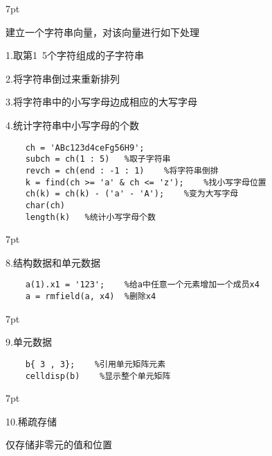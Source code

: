 \documentclass{article} %
\newenvironment{eg}{%
\def\FrameCommand{%
\hspace{1pt}%
{\color{Gray}\vrule width 2pt}%
{\color{egshade}\vrule width 4pt}%
\colorbox{egshade}%
}%
\MakeFramed{\advance\hsize-\width\FrameRestore}%
\noindent\hspace{-4.55pt}%
\begin{adjustwidth}{}{7pt}%
\vspace{2pt}\vspace{2pt}%
\normalfont %
}
{%
\vspace{2pt}\end{adjustwidth}\endMakeFramed%
}
\newenvironment{wa}{%
\def\FrameCommand{%
\hspace{1pt}%
{\color{LightCoral}\vrule width 2pt}%
{\color{washade}\vrule width 4pt}%
\colorbox{washade}%
}%
\MakeFramed{\advance\hsize-\width\FrameRestore}%
\noindent\hspace{-4.55pt}%
\begin{adjustwidth}{}{7pt}%
\vspace{2pt}\vspace{2pt}%
\normalfont %
}
{%
\vspace{2pt}\end{adjustwidth}\endMakeFramed%
}
\begin{document}
\begin{wa}
    建立一个字符串向量，对该向量进行如下处理

    1.取第1~5个字符组成的子字符串

    2.将字符串倒过来重新排列

    3.将字符串中的小写字母边成相应的大写字母

    4.统计字符串中小写字母的个数
\end{wa}
\begin{lstlisting}
    ch = 'ABc123d4ceFg56H9';
    subch = ch(1 : 5)   %取子字符串
    revch = ch(end : -1 : 1)    %将字符串倒排
    k = find(ch >= 'a' & ch <= 'z');    %找小写字母位置
    ch(k) = ch(k) - ('a' - 'A');    %变为大写字母
    char(ch)
    length(k)   %统计小写字母个数
\end{lstlisting}

\begin{eg}
    8.结构数据和单元数据
\end{eg}
\begin{lstlisting}
    a(1).x1 = '123';    %给a中任意一个元素增加一个成员x4
    a = rmfield(a, x4)  %删除x4    
\end{lstlisting}

\begin{eg}
    9.单元数据
\end{eg}
\begin{lstlisting}
    b{ 3 , 3};    %引用单元矩阵元素
    celldisp(b)    %显示整个单元矩阵
\end{lstlisting}

\begin{eg}
    10.稀疏存储

    仅存储非零元的值和位置
\end{eg}
\end{document}
